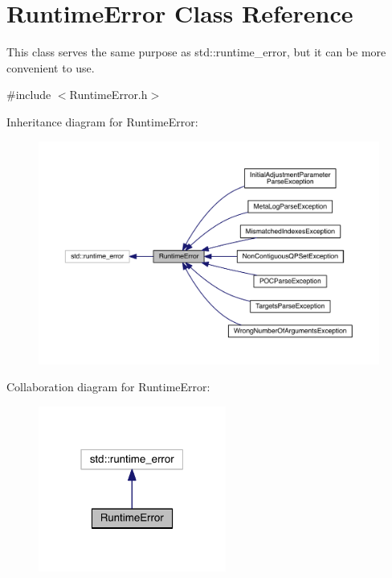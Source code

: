 \hypertarget{class_runtime_error}{}\section{Runtime\+Error Class Reference}
\label{class_runtime_error}


This class serves the same purpose as std\+::runtime\+\_\+error, but it can be more convenient to use.  




{\ttfamily \#include $<$Runtime\+Error.\+h$>$}



Inheritance diagram for Runtime\+Error\+:
\nopagebreak
\begin{figure}[H]
\begin{center}
\leavevmode
\includegraphics[width=350pt]{da/d57/class_runtime_error__inherit__graph}
\end{center}
\end{figure}


Collaboration diagram for Runtime\+Error\+:
\nopagebreak
\begin{figure}[H]
\begin{center}
\leavevmode
\includegraphics[width=175pt]{d3/d6d/class_runtime_error__coll__graph}
\end{center}
\end{figure}
